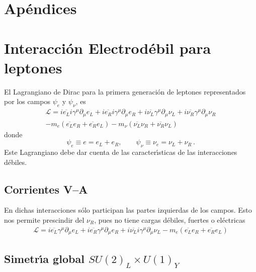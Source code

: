 \section{Apéndices}


\section{Interacci\'on Electrod\'ebil para leptones}
\label{sec:inter-electr}
El Lagrangiano de Dirac para la primera generaci\'on de leptones representados por los campos $\psi_e$ y $\psi_\nu$, es
\begin{align}
\mathcal{L}=i\overline{e_L}i\gamma^\mu\partial_\mu e_L+i\overline{e_R}i\gamma^\mu\partial_\mu e_R
  +i\overline{\nu_L}\gamma^\mu\partial_\mu\nu_L+i\overline{\nu_R}\gamma^\mu\partial_\mu\nu_R\nonumber\\
  -m_e(\overline{e_L}e_R+\overline{e_R}e_L)
  -m_\nu(\overline{\nu_L}\nu_R+\overline{\nu_R}\nu_L)
\end{align}
donde
\begin{equation}
  \psi_e\equiv e=e_L+e_R,\qquad \psi_\nu\equiv\nu_e=\nu_L+\nu_R\,.
\end{equation}
Este Lagrangiano debe dar cuenta de las caracter\'\i sticas de las interacciones d\'ebiles.
\subsection*{Corrientes V--A}
\label{sec:corrientes-v}
En dichas interacciones s\'olo participan las partes izquierdas de los campos. Esto nos permite prescindir del $\nu_R$, pues no tiene cargas d\'ebiles, fuertes o el\'ectricas
\begin{align}
  \label{eq:261}
  \mathcal{L}=i\overline{e_L}\gamma^\mu\partial_\mu e_L+i\overline{e_R}\gamma^\mu\partial_\mu e_R
  +i\overline{\nu_L}i\gamma^\mu\partial_\mu\nu_L-m_e(\overline{e_L}e_R+\overline{e_R}e_L)
\end{align}

\subsection*{Simetr\'\i a global $SU(2)_L\times U(1)_Y$}
\label{sec:simetr-glob-su2_l}

